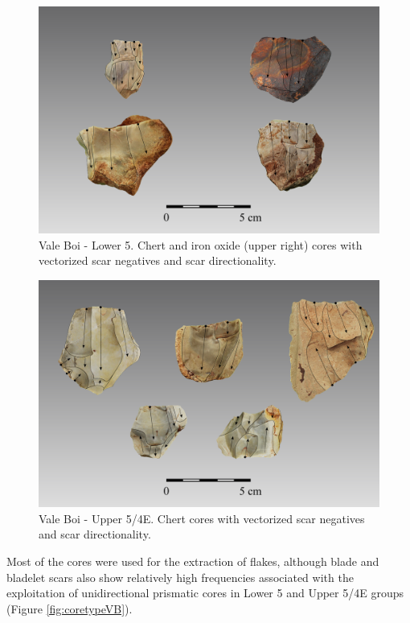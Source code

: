 \documentclass[12pt,twoside]{reedthesis}
\begin{document}
~
\begin{figure}[H]

{\centering \includegraphics[width=0.8\linewidth]{figure/coreL} 

}

\caption{Vale Boi - Lower 5. Chert and iron oxide (upper right) cores with vectorized scar negatives and scar directionality.}\label{fig:corelower}
\end{figure}
\begin{figure}[H]

{\centering \includegraphics[width=0.8\linewidth]{figure/coreU} 

}

\caption{Vale Boi - Upper 5/4E. Chert cores with vectorized scar negatives and scar directionality.}\label{fig:coreupper}
\end{figure}
\newpage

Most of the cores were used for the extraction of flakes, although blade and bladelet scars also show relatively high frequencies associated with the exploitation of unidirectional prismatic cores in Lower 5 and Upper 5/4E groups (Figure \ref{fig:coretypeVB}).
\end{document}

